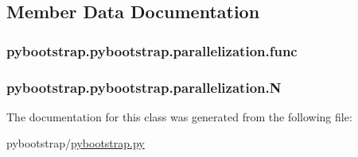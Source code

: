 \subsection{Member Data Documentation}
\hypertarget{classpybootstrap_1_1pybootstrap_1_1parallelization_ae150d8b397d2e75c0fe227beb6db2afa}{
\subsubsection[{func}]{\setlength{\rightskip}{0pt plus 5cm}pybootstrap.\-pybootstrap.\-parallelization.\-func}}\label{classpybootstrap_1_1pybootstrap_1_1parallelization_ae150d8b397d2e75c0fe227beb6db2afa}
\hypertarget{classpybootstrap_1_1pybootstrap_1_1parallelization_a53e7429c967d96d9dca1aa2aa282a517}{
\subsubsection[{N}]{\setlength{\rightskip}{0pt plus 5cm}pybootstrap.\-pybootstrap.\-parallelization.\-N}}\label{classpybootstrap_1_1pybootstrap_1_1parallelization_a53e7429c967d96d9dca1aa2aa282a517}


The documentation for this class was generated from the following file\-:\begin{DoxyCompactItemize}
\item 
pybootstrap/\hyperlink{pybootstrap_8py}{pybootstrap.\-py}\end{DoxyCompactItemize}
